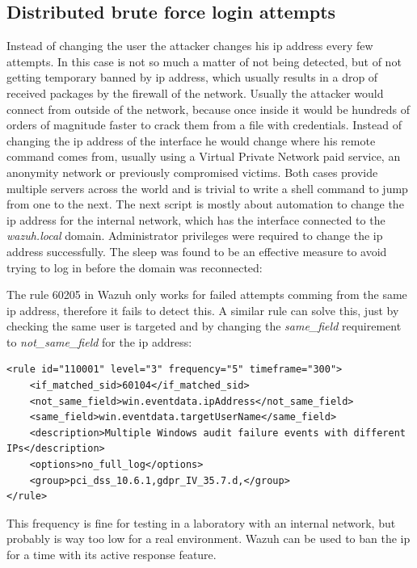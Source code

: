 \subsection{Distributed brute force login attempts}
Instead of changing the user the attacker changes his ip address every few attempts. In this case is not so much a matter of not being detected, but of not getting temporary banned by ip address, which usually results in a drop of received packages by the firewall of the network.
\linej
\linej
Usually the attacker would connect from outside of the network, because once inside it would be hundreds of orders of magnitude faster to crack them from a file with credentials.
Instead of changing the ip address of the interface he would change where his remote command comes from, usually using a Virtual Private Network paid service, an anonymity network or previously compromised victims.
Both cases provide multiple servers across the world and is trivial to write a shell command to jump from one to the next.
\linej
The next script is mostly about automation to change the ip address for the internal network, which has the interface connected to the \textit{wazuh.local} domain.
Administrator privileges were required to change the ip address successfully. The sleep was found to be an effective measure to avoid trying to log in before the domain was reconnected:


\linej
The rule 60205 in Wazuh only works for failed attempts comming from the same ip address, therefore it fails to detect this. A similar rule can solve this, just by checking the same user is targeted and by changing the \textit{same\_field} requirement to \textit{not\_same\_field} for the ip address:
\begin{lstlisting}[style=xml]
<rule id="110001" level="3" frequency="5" timeframe="300">
	<if_matched_sid>60104</if_matched_sid>
	<not_same_field>win.eventdata.ipAddress</not_same_field>
	<same_field>win.eventdata.targetUserName</same_field>
	<description>Multiple Windows audit failure events with different IPs</description>
	<options>no_full_log</options>
	<group>pci_dss_10.6.1,gdpr_IV_35.7.d,</group>
</rule>
\end{lstlisting}
\linej
This frequency is fine for testing in a laboratory with an internal network, but probably is way too low for a real environment.
Wazuh can be used to ban the ip for a time with its active response feature\cite{active_response}.


